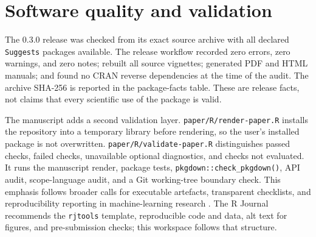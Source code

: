 \begin{table}
\centering
\caption{\label{tab:governance-validation-table}Governance and reproducibility evidence generated by the case study.}
\centering
{}
\end{table}

\section{Software quality and validation}\label{software-quality-and-validation}

The 0.3.0 release was checked from its exact source archive with all declared \texttt{Suggests} packages available. The release workflow recorded zero errors, zero warnings, and zero notes; rebuilt all source vignettes; generated PDF and HTML manuals; and found no CRAN reverse dependencies at the time of the audit. The archive SHA-256 is reported in the package-facts table. These are release facts, not claims that every scientific use of the package is valid.

The manuscript adds a second validation layer. \texttt{paper/R/render-paper.R} installs the repository into a temporary library before rendering, so the user's installed package is not overwritten. \texttt{paper/R/validate-paper.R} distinguishes passed checks, failed checks, unavailable optional diagnostics, and checks not evaluated. It runs the manuscript render, package tests, \texttt{pkgdown::check\_pkgdown()}, API audit, scope-language audit, and a Git working-tree boundary check. This emphasis follows broader calls for executable artefacts, transparent checklists, and reproducibility reporting in machine-learning research \citep{Pineau2021}. The R Journal recommends the \texttt{rjtools} template, reproducible code and data, alt text for figures, and pre-submission checks; this workspace follows that structure.

